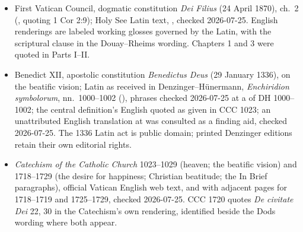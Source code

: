 {\fontsize{8.6}{9.6}\selectfont
\begin{itemize}[itemsep=0pt,parsep=0pt,topsep=0.05em]
\item First Vatican Council, dogmatic constitution \emph{Dei Filius} (24 April 1870), ch.~2 (, quoting 1 Cor 2:9); Holy See Latin text, , checked 2026-07-25. English renderings are labeled working glosses governed by the Latin, with the scriptural clause in the Douay--Rheims wording. Chapters 1 and 3 were quoted in Parts I--II.
\item Benedict XII, apostolic constitution \emph{Benedictus Deus} (29 January 1336), on the beatific vision; Latin as received in Denzinger--Hünermann, \emph{Enchiridion symbolorum}, nn.~1000--1002 (), phrases checked 2026-07-25 at a  of DH 1000--1002; the central definition's English quoted as given in CCC 1023; an unattributed English translation at  was consulted as a finding aid, checked 2026-07-25. The 1336 Latin act is public domain; printed Denzinger editions retain their own editorial rights.
\item \emph{Catechism of the Catholic Church} 1023--1029 (heaven; the beatific vision) and 1718--1729 (the desire for happiness; Christian beatitude; the In Brief paragraphs), official Vatican English web text,  and  with adjacent pages for 1718--1719 and 1725--1729, checked 2026-07-25. CCC 1720 quotes \emph{De civitate Dei} 22, 30 in the Catechism's own rendering, identified beside the Dods wording where both appear.
\end{itemize}}

\endgroup
